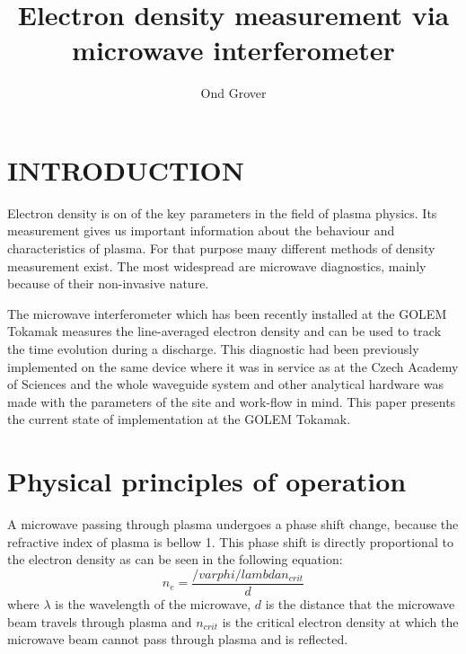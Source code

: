 \documentclass[twoside]{articlek}
\title{Electron density measurement via microwave interferometer}
\author{Ond Grover}
\begin{document}
\maketitle{}
\section{INTRODUCTION}
Electron density is on of the key parameters in the field of plasma physics. Its measurement gives us important information about the behaviour and characteristics of plasma. For that purpose many different methods of density measurement exist.%
The most widespread are microwave diagnostics, mainly because of their non-invasive nature. 

The microwave interferometer which has been recently installed at the GOLEM Tokamak measures the line-averaged electron density and can be used to track the time evolution during a discharge.%
This diagnostic had been previously implemented on the same device where it was in service as  %
at the Czech Academy of Sciences and the whole waveguide system and other analytical hardware was made with the parameters of the site and work-flow in mind. This paper presents the current state of implementation at the GOLEM Tokamak.

\section{Physical principles of operation} %

A microwave passing through plasma undergoes a phase shift change, because the refractive index of plasma is bellow 1. %
This phase shift is directly proportional to the electron density as can be seen in the following equation:
\begin{equation}
    n_e=\frac{/varphi /lambda n_{crit}}{d}
    \label{eq:ne}
\end{equation}
where $\lambda$ is the wavelength of the microwave, $d$ is the distance that the microwave beam travels through plasma and $n_{crit}$ is the critical electron density at which the microwave beam cannot pass through plasma and is reflected.
\end{document}

